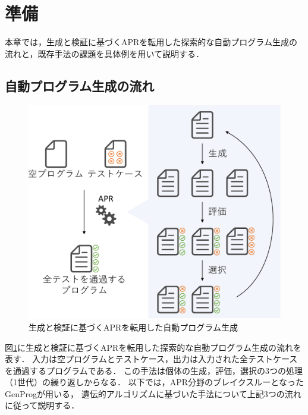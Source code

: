 \documentclass[uplatex,dvipdfmx,a4paper]{jsarticle}
\let\oldcite\cite
\renewcommand{\cite}[1]{\xspace\oldcite{#1}}
\begin{document}
\clearpage
\section{準備}
本章では，生成と検証に基づくAPRを転用した探索的な自動プログラム生成の流れと，既存手法の課題を具体例を用いて説明する．

\subsection{自動プログラム生成の流れ} \label{sec:prev_apg}

\begin{figure}[t]
  \centering
  \includegraphics[width=\linewidth]{fig/gaFlow.pdf}
  \caption{生成と検証に基づくAPRを転用した自動プログラム生成}
  \label{fig:gaflow}
\end{figure}

図\ref{fig:gaflow}に生成と検証に基づくAPRを転用した探索的な自動プログラム生成の流れを表す．
入力は空プログラムとテストケース，出力は入力された全テストケースを通過するプログラムである．
この手法は個体の生成，評価，選択の3つの処理（1世代）の繰り返しからなる．
以下では，APR分野のブレイクスルーとなったGenProg\cite{le2011genprog}が用いる，
遺伝的アルゴリズムに基づいた手法について上記3つの流れに従って説明する．
\end{document}
